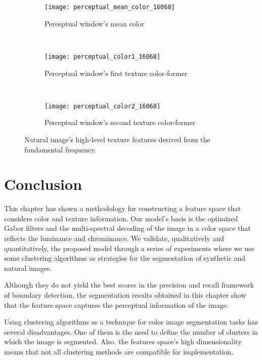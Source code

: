 \begin{figure}[!ht]
    \centering
    \begin{subfigure}[b]{0.7\textwidth}
    	\texttt{[image: perceptual\_mean\_color\_16068]}
        \caption{Perceptual window's mean color}
        \label{fig:perceptual_mean_color_16068}
    \end{subfigure}\\
    \begin{subfigure}[b]{0.7\textwidth}
    	\texttt{[image: perceptual\_color1\_16068]}
        \caption{Perceptual window's first texture color-former}
        \label{fig:perceptual_color1_16068}
    \end{subfigure}\\
    \begin{subfigure}[b]{0.7\textwidth}
    	\texttt{[image: perceptual\_color2\_16068]}
        \caption{Perceptual window's second texture color-former}
        \label{fig:perceptual_color2_16068}
    \end{subfigure}    
                  
    \caption{Natural image's high-level texture features derived from the fundamental frequency.}\label{fig:colors_high_level_features_zebre}    
\end{figure}


\section{Conclusion}
This chapter has shown a methodology for constructing a feature space that considers color and texture information. Our model's basis is the optimized Gabor filters and the multi-spectral decoding of the image in a color space that reflects the luminance and chrominance.
We validate, qualitatively and quantitatively, the proposed model through a series of experiments where we use some clustering algorithms as strategies for the segmentation of synthetic and natural images.

Although they do not yield the best scores in the precision and recall framework of boundary detection, the segmentation results obtained in this chapter show that the feature space captures the perceptual information of the image.

Using clustering algorithms as a technique for color image segmentation tasks has several disadvantages. One of them is the need to define the number of clusters in which the image is segmented. Also, the features space's high dimensionality means that not all clustering methods are compatible for implementation.

